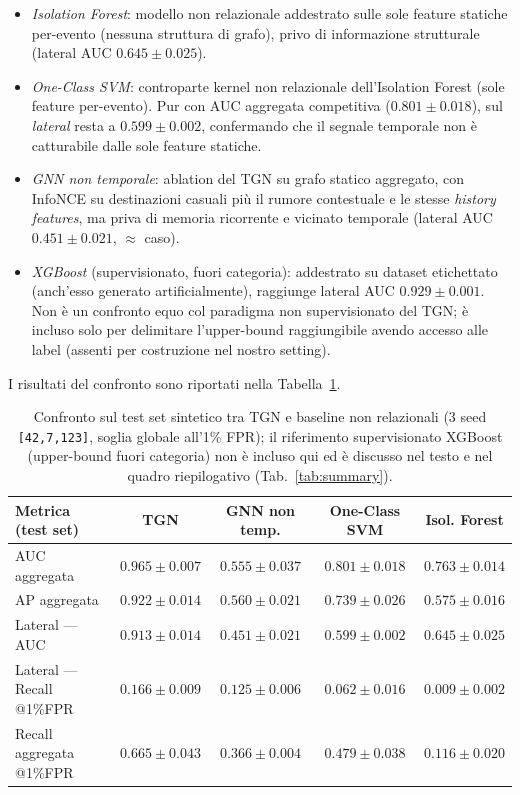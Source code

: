 \begin{itemize}
    \item \textit{Isolation Forest}: modello non relazionale addestrato sulle sole feature statiche per-evento (nessuna struttura di grafo), privo di informazione strutturale (lateral AUC $0.645\pm0.025$).
    \item \textit{One-Class SVM}: controparte kernel non relazionale dell'Isolation Forest (sole feature per-evento). Pur con AUC aggregata competitiva ($0.801\pm0.018$), sul \textit{lateral} resta a $0.599\pm0.002$, confermando che il segnale temporale non è catturabile dalle sole feature statiche.
    \item \textit{GNN non temporale}: ablation del TGN su grafo statico aggregato, con InfoNCE su destinazioni casuali più il rumore contestuale e le stesse \emph{history features}, ma priva di memoria ricorrente e vicinato temporale (lateral AUC $0.451\pm0.021$, $\approx$ caso).
    \item \textit{XGBoost} (supervisionato, fuori categoria): addestrato su dataset etichettato (anch'esso generato artificialmente), raggiunge lateral AUC $0.929\pm0.001$. Non è un confronto equo col paradigma non supervisionato del TGN; è incluso solo per delimitare l'upper-bound raggiungibile avendo accesso alle label (assenti per costruzione nel nostro setting).
\end{itemize}

I risultati del confronto sono riportati nella Tabella~\ref{tab:baselines}.

\begin{table}[ht!]
\centering
\footnotesize
\renewcommand{\arraystretch}{1.4}
\setlength{\tabcolsep}{5pt}
\begin{tabular}{l c c c c}
\hline
\textbf{Metrica (test set)} & \textbf{TGN} & \textbf{GNN non temp.} & \textbf{One-Class SVM} & \textbf{Isol. Forest} \\
\hline
AUC aggregata                  & $\mathbf{0.965}\pm0.007$ & $0.555\pm0.037$ & $0.801\pm0.018$ & $0.763\pm0.014$ \\
AP aggregata                   & $\mathbf{0.922}\pm0.014$ & $0.560\pm0.021$ & $0.739\pm0.026$ & $0.575\pm0.016$ \\
\hline
Lateral --- AUC                & $\mathbf{0.913}\pm0.014$ & $0.451\pm0.021$ & $0.599\pm0.002$ & $0.645\pm0.025$ \\
Lateral --- Recall @1\%FPR     & $\mathbf{0.166}\pm0.009$ & $0.125\pm0.006$ & $0.062\pm0.016$ & $0.009\pm0.002$ \\
Recall aggregata @1\%FPR       & $\mathbf{0.665}\pm0.043$ & $0.366\pm0.004$ & $0.479\pm0.038$ & $0.116\pm0.020$ \\
\hline
\end{tabular}
\caption{Confronto sul test set sintetico tra TGN e baseline non relazionali (3 seed \texttt{[42,7,123]}, soglia globale all'1\% FPR); il riferimento supervisionato XGBoost (upper-bound fuori categoria) non è incluso qui ed è discusso nel testo e nel quadro riepilogativo (Tab.~\ref{tab:summary}).}
\label{tab:baselines}
\end{table}

